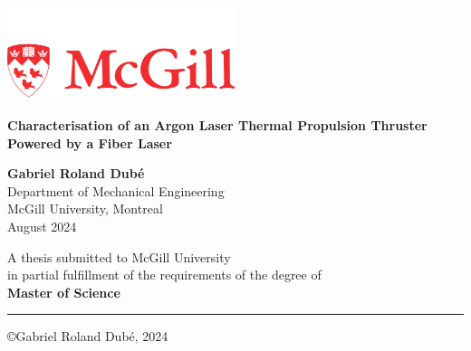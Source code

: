 \begin{titlepage}
  \thispagestyle{empty}
  \sffamily
  \begin{center}
    \includegraphics[width=0.5\textwidth]{assets/McGill_logo.pdf} \\
    \vspace*{2cm}
    
    \huge
    \textbf{Characterisation of an Argon Laser Thermal Propulsion Thruster Powered by a Fiber Laser}
    
    \large

    
    \vspace{1.5cm}    
    \textbf{Gabriel Roland Dubé}\\

    
    \vspace{0.5cm}
    Department of Mechanical Engineering\\
    McGill University, Montreal\\

    \vspace{1.5cm}
    August 2024\\
    \vspace{1.5cm}
    
    A thesis submitted to McGill University \\
    in partial fulfillment of the requirements of the degree of\\
    \textbf{Master of Science}\\
    
    \vfill

    {\color{red}\hrule}

    \copyright Gabriel Roland Dubé, 2024
            
  \end{center}
\end{titlepage}